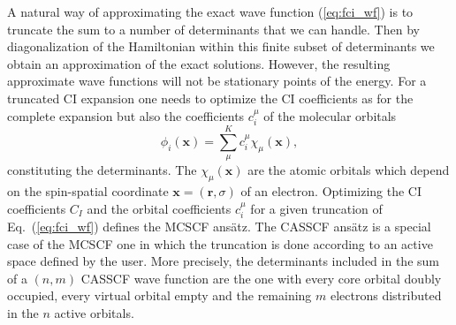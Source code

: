 \documentclass[aps,prb,reprint,showkeys,superscriptaddress]{revtex4-1}
\begin{document}
A natural way of approximating the exact wave function (\ref{eq:fci_wf}) is to truncate the sum to a number of determinants that we can handle. Then by diagonalization of the Hamiltonian within this finite subset of determinants we obtain an approximation of the exact solutions.
However, the resulting approximate wave functions will not be stationary points of the energy.
For a truncated CI expansion one needs to optimize the CI coefficients as for the complete expansion but also the coefficients $c_i^\mu$ of the molecular orbitals
\begin{equation}
  \label{eq:mo}
  \phi_i(\bm{x}) = \sum^K_\mu c_i^\mu \chi_{\mu}(\bm{x}),
\end{equation}
constituting the determinants. The $\chi_{\mu}(\bm{x})$ are the atomic orbitals which depend on the spin-spatial coordinate $\bm{x} = (\bm{r},\sigma)$ of an electron.
Optimizing the CI coefficients $C_I$ and the orbital coefficients $c_i^\mu$ for a given truncation of Eq.~(\ref{eq:fci_wf}) defines the MCSCF ans\"atz.
The CASSCF ans\"atz is a special case of the MCSCF one in which the truncation is done according to an active space defined by the user.
More precisely, the determinants included in the sum of a $(n,m)$ CASSCF wave function are the one with every core orbital doubly occupied, every virtual orbital empty and the remaining $m$ electrons distributed in the $n$ active orbitals.
\end{document}
